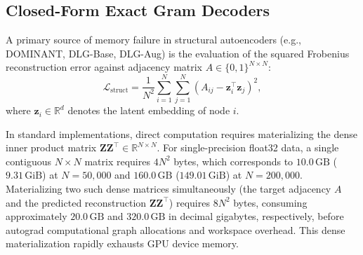 \documentclass[11pt,a4paper]{article}
\begin{document}
\subsection{Closed-Form Exact Gram Decoders}
A primary source of memory failure in structural autoencoders (e.g., DOMINANT, DLG-Base, DLG-Aug) is the evaluation of the squared Frobenius reconstruction error against adjacency matrix $A \in \{0, 1\}^{N \times N}$:
\begin{equation}
\mathcal{L}_{\mathrm{struct}} = \frac{1}{N^2} \sum_{i=1}^N \sum_{j=1}^N \left(A_{ij} - \mathbf{z}_i^\top \mathbf{z}_j\right)^2,
\label{eq:dense_loss}
\end{equation}
where $\mathbf{z}_i \in \mathbb{R}^d$ denotes the latent embedding of node $i$. 

In standard implementations, direct computation requires materializing the dense inner product matrix $\mathbf{Z} \mathbf{Z}^\top \in \mathbb{R}^{N \times N}$. For single-precision float32 data, a single contiguous $N \times N$ matrix requires $4 N^2$ bytes, which corresponds to $10.0\,\mathrm{GB}$ ($9.31\,\mathrm{GiB}$) at $N=50,000$ and $160.0\,\mathrm{GB}$ ($149.01\,\mathrm{GiB}$) at $N=200,000$. Materializing two such dense matrices simultaneously (the target adjacency $A$ and the predicted reconstruction $\mathbf{Z} \mathbf{Z}^\top$) requires $8 N^2$ bytes, consuming approximately $20.0\,\mathrm{GB}$ and $320.0\,\mathrm{GB}$ in decimal gigabytes, respectively, before autograd computational graph allocations and workspace overhead. This dense materialization rapidly exhausts GPU device memory.
\end{document}
